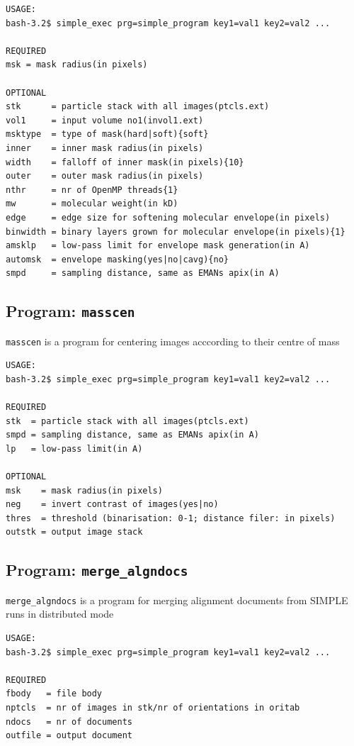 \documentclass[a4paper,11pt]{article}
\newcommand{\prgname}[1]{\textcolor{NavyBlue}{\texttt{#1}}}
\begin{document}
\begin{verbatim}
USAGE:
bash-3.2$ simple_exec prg=simple_program key1=val1 key2=val2 ...

REQUIRED
msk = mask radius(in pixels)

OPTIONAL
stk      = particle stack with all images(ptcls.ext)
vol1     = input volume no1(invol1.ext)
msktype  = type of mask(hard|soft){soft}
inner    = inner mask radius(in pixels)
width    = falloff of inner mask(in pixels){10}
outer    = outer mask radius(in pixels)
nthr     = nr of OpenMP threads{1}
mw       = molecular weight(in kD)
edge     = edge size for softening molecular envelope(in pixels)
binwidth = binary layers grown for molecular envelope(in pixels){1}
amsklp   = low-pass limit for envelope mask generation(in A)
automsk  = envelope masking(yes|no|cavg){no}
smpd     = sampling distance, same as EMANs apix(in A)
\end{verbatim}

\subsection{Program: \prgname{masscen}}
\label{masscen}
\prgname{masscen} is a program for centering images acccording to their centre of mass

\begin{verbatim}
USAGE:
bash-3.2$ simple_exec prg=simple_program key1=val1 key2=val2 ...

REQUIRED
stk  = particle stack with all images(ptcls.ext)
smpd = sampling distance, same as EMANs apix(in A)
lp   = low-pass limit(in A)

OPTIONAL
msk    = mask radius(in pixels)
neg    = invert contrast of images(yes|no)
thres  = threshold (binarisation: 0-1; distance filer: in pixels)
outstk = output image stack
\end{verbatim}

\subsection{Program: \prgname{merge\_algndocs}}
\label{merge_algndocs}
\prgname{merge\_algndocs} is a program for merging alignment documents from SIMPLE runs in distributed mode

\begin{verbatim}
USAGE:
bash-3.2$ simple_exec prg=simple_program key1=val1 key2=val2 ...

REQUIRED
fbody   = file body
nptcls  = nr of images in stk/nr of orientations in oritab
ndocs   = nr of documents
outfile = output document
\end{verbatim}
\end{document}
